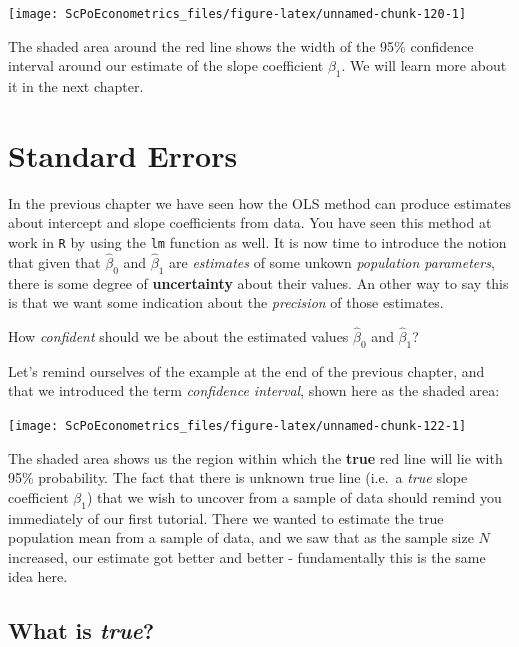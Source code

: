 \documentclass[]{book}
\newenvironment{note}{\begin{tcolorbox}[colback=blue!5!white,colframe=blue!75!black,title=\textbf{Note:}]}{\end{tcolorbox}}
\theoremstyle{definition}
\theoremstyle{definition}
\theoremstyle{definition}
\theoremstyle{remark}
\begin{document}
\begin{center}\texttt{[image: ScPoEconometrics\_files/figure-latex/unnamed-chunk-120-1]} \end{center}

The shaded area around the red line shows the width of the 95\%
confidence interval around our estimate of the slope coefficient
\(\beta_1\). We will learn more about it in the next chapter.

\chapter{Standard Errors}\label{std-errors}

In the previous chapter we have seen how the OLS method can produce
estimates about intercept and slope coefficients from data. You have
seen this method at work in \texttt{R} by using the \texttt{lm} function
as well. It is now time to introduce the notion that given that
\(\hat{\beta}_0\) and \(\hat{\beta}_1\) are \emph{estimates} of some
unkown \emph{population parameters}, there is some degree of
\textbf{uncertainty} about their values. An other way to say this is
that we want some indication about the \emph{precision} of those
estimates.

\begin{note}
How \emph{confident} should we be about the estimated values
\(\hat{\beta}_0\) and \(\hat{\beta}_1\)?
\end{note}

 Let's remind ourselves of the example at the end of the previous
chapter, and that we introduced the term \emph{confidence interval},
shown here as the shaded area:

\begin{center}\texttt{[image: ScPoEconometrics\_files/figure-latex/unnamed-chunk-122-1]} \end{center}

The shaded area shows us the region within which the \textbf{true} red
line will lie with 95\% probability. The fact that there is unknown true
line (i.e.~a \emph{true} slope coefficient \(\beta_1\)) that we wish to
uncover from a sample of data should remind you immediately of our first
tutorial. There we wanted to estimate the true population mean from a
sample of data, and we saw that as the sample size \(N\) increased, our
estimate got better and better - fundamentally this is the same idea
here.

\section{\texorpdfstring{What is
\emph{true}?}{What is true?}}\label{what-is-true}
\end{document}
